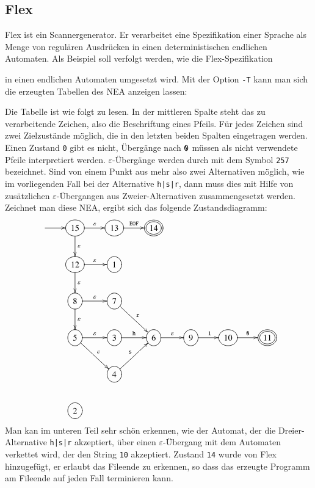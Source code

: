 \subsection{Flex}
Flex ist ein Scannergenerator.
Er verarbeitet eine Spezifikation einer
Sprache als Menge von regulären Ausdrücken in einen deterministischen 
endlichen Automaten.
Als Beispiel soll verfolgt werden, wie die
Flex-Spezifikation

in einen endlichen Automaten umgesetzt wird.
Mit der Option {\tt -T}
kann man sich die erzeugten Tabellen des NEA anzeigen lassen:

Die Tabelle ist wie folgt zu lesen.
In der mittleren Spalte steht das zu verarbeitende Zeichen, also
die Beschriftung eines Pfeils.
Für jedes Zeichen sind zwei Zielzustände
möglich, die in den letzten beiden Spalten eingetragen werden.
Einen
Zustand {\tt 0} gibt es nicht, Übergänge nach ${\tt 0}$ müssen als
nicht verwendete Pfeile interpretiert werden.
$\varepsilon$-Übergänge
werden durch mit dem Symbol {\tt 257} bezeichnet.
Sind von einem Punkt
aus mehr also zwei Alternativen möglich, wie im vorliegenden Fall
bei der Alternative {\tt h|s|r}, dann muss dies mit Hilfe von zusätzlichen
$\varepsilon$-Übergangen aus Zweier-Alternativen zusammengesetzt werden.
Zeichnet man diese NEA, ergibt sich das folgende Zustandsdiagramm:
\[
\entrymodifiers={++[o][F]}
\xymatrix{
*+\txt{}\ar[r]
	&{15} \ar[r]^{\varepsilon} \ar[d]^{\varepsilon}
		&{13}\ar[r]^{{\tt EOF}}
			&*++[o][F=]{14}
\\
*+\txt{}
	&{12}\ar[d]^{\varepsilon} \ar[r]^{\varepsilon}
		&{1}
\\
*+\txt{}
	&{8}\ar[d]^{\varepsilon} \ar[r]^{\varepsilon}
		&{7}\ar[dr]^{\tt r}
\\
*+\txt{}
	&{5}\ar[dr]^{\varepsilon} \ar[r]^{\varepsilon}
		&{3}\ar[r]^{\tt h}
			&{6}\ar[r]^{\varepsilon}
				&{9}\ar[r]^{\tt 1}
					&{10}\ar[r]^{\tt 0}
						&*++[o][F=]{11}
\\
*+\txt{}
	&*+\txt{}
		&{4}\ar[ur]^{\tt s}
\\
*+\txt{}
	&{2}
}
\]
Man kan im unteren Teil sehr schön erkennen, wie der Automat, der
die Dreier-Alternative {\tt h|s|r} akzeptiert, über einen
$\varepsilon$-Übergang mit dem Automaten verkettet wird, der 
den String {\tt 10} akzeptiert.
Zustand {\tt 14} wurde von Flex
hinzugefügt, er erlaubt das Fileende zu erkennen, so dass das
erzeugte Programm am Fileende auf jeden Fall terminieren kann.

